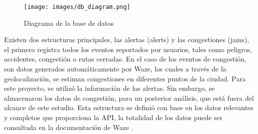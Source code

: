 \documentclass[12pt]{article}
\begin{document}
\begin{figure}[H]
    \centering
    \texttt{[image: images/db\_diagram.png]}
    \caption{Diagrama de la base de datos}
    \label{fig:db_diagram}
\end{figure}

Existen dos estructuras principales, las alertas (alerts) y las congestiones (jams), el primero registra todos los eventos reportados por usuarios, tales como peligros, accidentes, congestión o rutas cerradas. En el caso de los eventos de congestión, son datos generados automáticamente por Waze, los cuales a través de la geolocalización, se estiman congestiones en diferentes puntos de la ciudad. Para este proyecto, se utilizó la información de las alertas. Sin embargo, se almacenaron los datos de congestión, para un posterior análisis, que está fuera del alcance de este estudio. Esta estructura se definió con base en los datos relevantes y completos que proporciona la API, la totalidad de los datos puede ser consultada en la documentación de Waze \parencite{waze2024}.



\printbibliography
\end{document}
